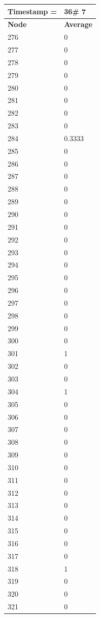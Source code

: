 \begin{tabular}{|l||l|}
\hline
\textbf{Timestamp =} & \textbf{36}\# 7\\\hline
	\textbf{Node} & \textbf{Average} \\ \hline
\hline
	276 & 0 \\ \hline
	277 & 0 \\ \hline
	278 & 0 \\ \hline
	279 & 0 \\ \hline
	280 & 0 \\ \hline
	281 & 0 \\ \hline
	282 & 0 \\ \hline
	283 & 0 \\ \hline
	284 & 0.3333 \\ \hline
	285 & 0 \\ \hline
	286 & 0 \\ \hline
	287 & 0 \\ \hline
	288 & 0 \\ \hline
	289 & 0 \\ \hline
	290 & 0 \\ \hline
	291 & 0 \\ \hline
	292 & 0 \\ \hline
	293 & 0 \\ \hline
	294 & 0 \\ \hline
	295 & 0 \\ \hline
	296 & 0 \\ \hline
	297 & 0 \\ \hline
	298 & 0 \\ \hline
	299 & 0 \\ \hline
	300 & 0 \\ \hline
	301 & 1 \\ \hline
	302 & 0 \\ \hline
	303 & 0 \\ \hline
	304 & 1 \\ \hline
	305 & 0 \\ \hline
	306 & 0 \\ \hline
	307 & 0 \\ \hline
	308 & 0 \\ \hline
	309 & 0 \\ \hline
	310 & 0 \\ \hline
	311 & 0 \\ \hline
	312 & 0 \\ \hline
	313 & 0 \\ \hline
	314 & 0 \\ \hline
	315 & 0 \\ \hline
	316 & 0 \\ \hline
	317 & 0 \\ \hline
	318 & 1 \\ \hline
	319 & 0 \\ \hline
	320 & 0 \\ \hline
	321 & 0 \\ \hline
\end{tabular}
